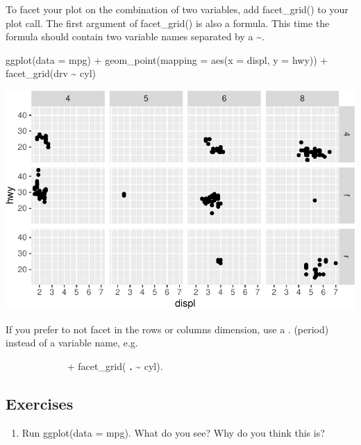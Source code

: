 \documentclass[
  letterpaper,
  DIV=11,
  numbers=noendperiod]{scrreprt}
\newenvironment{Shaded}{\begin{snugshade}}{\end{snugshade}}
\newcommand{\AttributeTok}[1]{\textcolor[rgb]{0.40,0.45,0.13}{#1}}
\newcommand{\FunctionTok}[1]{\textcolor[rgb]{0.28,0.35,0.67}{#1}}
\newcommand{\NormalTok}[1]{\textcolor[rgb]{0.00,0.23,0.31}{#1}}
\newcommand{\SpecialCharTok}[1]{\textcolor[rgb]{0.37,0.37,0.37}{#1}}
\providecommand{\tightlist}{%
  \setlength{\itemsep}{0pt}\setlength{\parskip}{0pt}}\usepackage{longtable,booktabs,array}
\begin{document}
To facet your plot on the combination of two variables, add
facet\_grid() to your plot call. The first argument of facet\_grid() is
also a formula. This time the formula should contain two variable names
separated by a \textasciitilde.

\begin{Shaded}
\begin{Highlighting}[]
\FunctionTok{ggplot}\NormalTok{(}\AttributeTok{data =}\NormalTok{ mpg) }\SpecialCharTok{+} 
  \FunctionTok{geom\_point}\NormalTok{(}\AttributeTok{mapping =} \FunctionTok{aes}\NormalTok{(}\AttributeTok{x =}\NormalTok{ displ, }\AttributeTok{y =}\NormalTok{ hwy)) }\SpecialCharTok{+} 
  \FunctionTok{facet\_grid}\NormalTok{(drv }\SpecialCharTok{\textasciitilde{}}\NormalTok{ cyl)}
\end{Highlighting}
\end{Shaded}

\includegraphics{Beginning_Data_Visualization_files/figure-pdf/Example 7-1.pdf}

If you prefer to not facet in the rows or columns dimension, use a \(.\)
(period) instead of a variable name, e.g.~

\(\hspace{1in}\) + facet\_grid( \textbf{.} \textasciitilde{} cyl).

\subsection*{Exercises}\label{exercises}

\begin{enumerate}
\def\labelenumi{\arabic{enumi}.}
\tightlist
\item
  Run ggplot(data = mpg). What do you see? Why do you think this is?
\end{enumerate}
\end{document}
